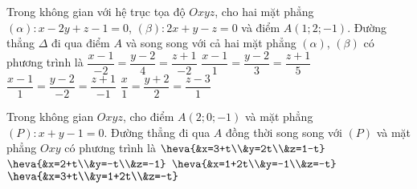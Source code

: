 \begin{ex}%
	Trong không gian với hệ trục tọa độ $Oxyz$, cho hai mặt phẳng $(\alpha) \colon x-2y+z-1=0$, $(\beta) \colon 2x+y-z=0$ và điểm $A(1;2;-1)$. Đường thẳng $\Delta $ đi qua điểm $A$ và song song với cả hai mặt phẳng $(\alpha)$, $(\beta)$ có phương trình là
	\choice
	{$\dfrac{x-1}{-2}=\dfrac{y-2}{4}=\dfrac{z+1}{-2}$}
	{\True $\dfrac{x-1}{1}=\dfrac{y-2}{3}=\dfrac{z+1}{5}$}
	{$\dfrac{x-1}{1}=\dfrac{y-2}{-2}=\dfrac{z+1}{-1}$}
	{$\dfrac{x}{1}=\dfrac{y+2}{2}=\dfrac{z-3}{1}$}
\end{ex}
\begin{ex}%
	Trong không gian $Oxyz$, cho điểm $A(2;0;-1)$ và mặt phẳng $(P)\colon x+y-1=0$. Đường thẳng đi qua $A$ đồng thời song song với $(P)$ và mặt phẳng $Oxy$ có phương trình là
	\choice
	{$\heva{&x=3+t\\&y=2t\\&z=1-t}$}
	{\True $\heva{&x=2+t\\&y=-t\\&z=-1}$}
	{$\heva{&x=1+2t\\&y=-1\\&z=-t}$}
	{$\heva{&x=3+t\\&y=1+2t\\&z=-t}$}
\end{ex}
